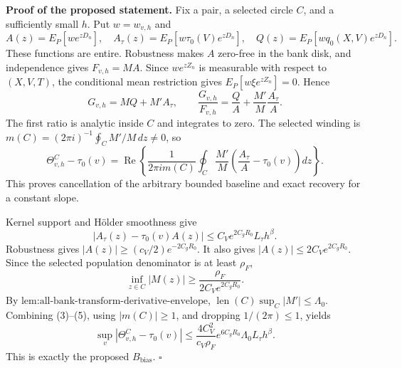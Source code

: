 \textbf{Proof of the proposed statement.}
Fix a pair, a selected circle \(C\), and a sufficiently small \(h\).  Put \(w=w_{v,h}\) and
\[
 A(z)=E_P[we^{zD_n}],\quad
 A_\tau(z)=E_P[w\tau_0(V)e^{zD_n}],\quad
 Q(z)=E_P[wq_0(X,V)e^{zD_n}]. \tag{1}
\]
These functions are entire.  Robustness makes \(A\) zero-free in the bank disk, and independence gives \(F_{v,h}=MA\).  Since \(we^{zZ_n}\) is measurable with respect to \((X,V,T)\), the conditional mean restriction gives \(E_P[w\xi e^{zZ_n}]=0\).  Hence
\[
 G_{v,h}=MQ+M'A_\tau,\qquad
 \frac{G_{v,h}}{F_{v,h}}=\frac QA+\frac{M'}M\frac{A_\tau}{A}. \tag{2}
\]
The first ratio is analytic inside \(C\) and integrates to zero.  The selected winding is \(m(C)=(2\pi i)^{-1}\oint_C M'/M\,dz\ne0\), so
\[
 \Theta^C_{v,h}-\tau_0(v)
 =\operatorname{Re}\left\{\frac1{2\pi i m(C)}\oint_C\frac{M'}M
 \left(\frac{A_\tau}{A}-\tau_0(v)\right)dz\right\}. \tag{3}
\]
This proves cancellation of the arbitrary bounded baseline and exact recovery for a constant slope.

Kernel support and H\"older smoothness give
\[
 |A_\tau(z)-\tau_0(v)A(z)|
 \le C_Ve^{2C_gR_0}L_\tau h^\beta. \tag{4}
\]
Robustness gives \(|A(z)|\ge(c_V/2)e^{-2C_gR_0}\).  It also gives \(|A(z)|\le2C_Ve^{2C_gR_0}\).  Since the selected population denominator is at least \(\rho_F\),
\[
 \inf_{z\in C}|M(z)|\ge\frac{\rho_F}{2C_Ve^{2C_gR_0}}. \tag{5}
\]
By \(\text{lem:all-bank-transform-derivative-envelope}\), \(\operatorname{len}(C)\sup_C|M'|\le\Lambda_0\).  Combining (3)--(5), using \(|m(C)|\ge1\), and dropping \(1/(2\pi)\le1\), yields
\[
 \sup_v|\Theta^C_{v,h}-\tau_0(v)|
 \le\frac{4C_V^2}{c_V\rho_F}e^{6C_gR_0}\Lambda_0L_\tau h^\beta.
\]
This is exactly the proposed \(B_{\mathrm{bias}}\). \(\square\)